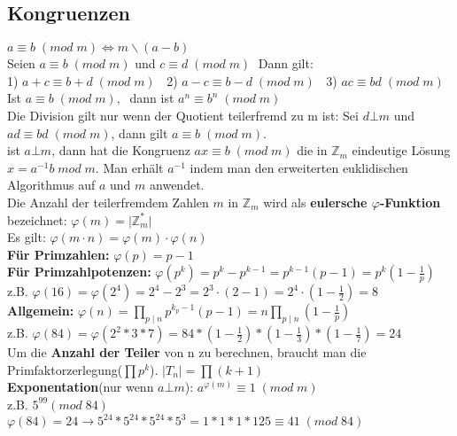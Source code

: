\documentclass[11pt]{article}
\begin{document}
\subsection{Kongruenzen}
$a \equiv b \; (mod\; m) \Longleftrightarrow m \backslash (a-b)$\\
Seien $a \equiv b \; (mod\; m)$ und $c \equiv d \; (mod\; m)\; $ Dann gilt:\\
1) $a+c \equiv b+d \; (mod\; m)\; \;$ 2) $a-c \equiv b-d \; (mod\; m)\; \;$ 3) $ac \equiv bd \; (mod\; m)\; \;$\\
Ist $a \equiv b \; (mod\; m),\; $ dann ist $a^n \equiv b^n \; (mod\; m)$\\
Die Division gilt nur wenn der Quotient teilerfremd zu m ist: Sei $d \bot m$ und $ad \equiv bd \; (mod\; m)$, dann gilt $a \equiv b \; (mod\; m)$.\\
ist $a \bot m$, dann hat die Kongruenz $ax \equiv b\; (mod\; m)$ die in $\mathbb{Z}_m$ eindeutige L{\"o}sung $x=a^{-1}b\; mod\;m$. Man erh{\"a}lt $a^{-1}$ indem man den erweiterten euklidischen Algorithmus auf $a$ und $m$ anwendet.\\
Die Anzahl der teilerfremdem Zahlen $m$ in $\mathbb{Z}_m$ wird als {\bfseries eulersche $\varphi$-Funktion} bezeichnet: $\varphi (m) = \mathopen| \mathbb{Z}^{*}_m \mathclose| $\\ Es gilt: $
    \varphi (m \cdot n) = \varphi (m) \cdot \varphi (n) $\\
{\bfseries F{\"u}r Primzahlen:} $\varphi(p) = p-1$\\
{\bfseries F{\"u}r Primzahlpotenzen:} $\varphi(p^k) = p^k-p^{k-1} = p^{k-1}(p-1)= p^{k}\left(1-\frac1{p}\right)$\\ z.B. $\varphi(16)=\varphi(2^4)=2^4-2^3=2^3\cdot (2-1)=2^4\cdot \left(1-\frac12\right) =8 $\\
{\bfseries Allgemein:} $\varphi(n) = \prod_{p\mid n} p^{k_p-1}(p-1) = n \prod_{p\mid n}\left(1-\frac{1}{p}\right) $\\
z.B. $\varphi (84) = \varphi (2^2*3*7)=84*(1-\frac{1}{2})*(1-\frac{1}{3})*(1-\frac{1}{7})=24$\\
Um die {\bfseries Anzahl der Teiler} von n zu berechnen, braucht man die Primfaktorzerlegung($\prod {p^k}$). $\mathopen| T_n \mathclose| = \prod{(k+1)}$\\
{\bfseries Exponentation}(nur wenn $a \bot m$): $a^{\varphi (m)} \equiv 1\;(mod\;m)$\\
z.B. $5^{99} (mod\;84)\;$\hspace{3mm}$ \varphi (84) = 24 \longrightarrow 5^{24}*5^{24}*5^{24}*5^3 = 1*1*1*125 \equiv 41\; (mod\; 84)$
\end{document}
